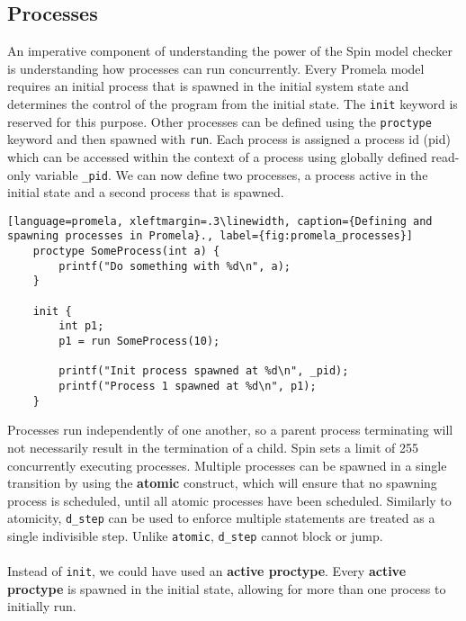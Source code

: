 \subsection{Processes}
An imperative component of understanding the power of the Spin model checker is understanding how processes can run concurrently. Every Promela model requires an initial process that is spawned in the initial system state and determines the control of the program from the initial state. The \texttt{init} keyword is reserved for this purpose. Other processes can be defined using the \texttt{proctype} keyword and then spawned with \texttt{run}. Each process is assigned a process id (pid) which can be accessed within the context of a process using globally defined read-only variable \texttt{\_pid}. We can now define two processes, a process active in the initial state and a second process that is spawned.
\begin{lstlisting}[language=promela, xleftmargin=.3\linewidth, caption={Defining and spawning processes in Promela}., label={fig:promela_processes}]
    proctype SomeProcess(int a) {
        printf("Do something with %d\n", a);
    }
    
    init {
        int p1;
        p1 = run SomeProcess(10);

        printf("Init process spawned at %d\n", _pid);
        printf("Process 1 spawned at %d\n", p1);
    }
\end{lstlisting}
Processes run independently of one another, so a parent process terminating will not necessarily result in the termination of a child. Spin sets a limit of 255 concurrently executing processes. Multiple processes can be spawned in a single transition by using the \textbf{atomic} construct, which will ensure that no spawning process is scheduled, until all atomic processes have been scheduled. Similarly to atomicity, \texttt{d\_step} can be used to enforce multiple statements are treated as a single indivisible step. Unlike \texttt{atomic}, \texttt{d\_step} cannot block or jump.
\\ \\
Instead of \texttt{init}, we could have used an \textbf{active proctype}. Every \textbf{active proctype} is spawned in the initial state, allowing for more than one process to initially run.
